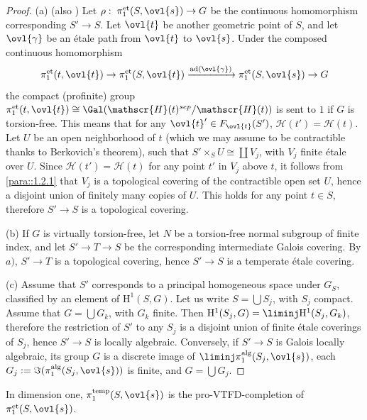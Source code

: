 \begin{proof}
 (a) (\cf also \cite{efgonas}) Let
 $\rho:\;\pi_1^{\mathrm{et}}(S,\ovl{s}) \to G$ be the 
 continuous homomorphism corresponding $S'\to S$. Let $\ovl{t}$ 
 be another geometric point of $S$, and let $\ovl{\gamma}$ be an \'etale
 path from $\ovl{t}$ to $\ovl{s}$.  Under the composed continuous homomorphism
 \begin{equation*}
  \pi_1^{\mathrm{et}}(t,\ovl{t})\to \pi_1^{\mathrm{et}}(S,\ovl{t})
   \xrightarrow{\mathrm{ad}(\ovl{\gamma})}\pi_1^{\mathrm{et}}(S,\ovl{s})\to G  
 \end{equation*}
 the compact (profinite) group $\pi_1^{\mathrm{et}}(t,\ovl{t})\cong
 \Gal(\mathscr{H}(t)^{sep}/\mathscr{H}(t))$ is sent to 
 $1$ if $G$ is torsion-free. This means that for any $\ovl{t}'\in
 F_{\ovl{t}}(S')$,  
 $\mathscr{H}(t')=\mathscr{H}(t)$. Let $U$ be an open neighborhood of $t$
 (which we may assume to be contractible thanks to Berkovich's theorem),
 such that $S'\times_S U\cong \coprod V_j$, with $V_j$ finite \'etale
 over $U$. Since $\mathscr{H}(t')=\mathscr{H}(t)$ for any point $t'$ in
 $V_j$ above $t$, it follows from \ref{para::1.2.1} that
 $V_j$ is a topological covering of
 the contractible open set $U$, hence a disjoint union of finitely many
 copies of $U$. This holds 
 for any point $t\in S$, therefore $S'\to S$ is a topological covering. 

 (b) If $G$ is virtually torsion-free, let $N$ be a torsion-free normal
 subgroup of finite index, and let $S'\to T\to S$ 
 be the corresponding intermediate Galois covering. By $a)$, $S'\to T$ is
 a topological covering, hence $S'\to S$ is a temperate \'etale covering.

 (c) Assume that $S'$ corresponds to a principal homogeneous space under
 $G_S$, classified by an element of $\mathrm{H}^1(S,G)$. Let us write
 $S=\bigcup S_j$, with $S_j$ compact. Assume that $G=\bigcup G_k$, with
 $G_k$ finite. Then $\mathrm{H}^1(S_j,G)= \liminj \mathrm{H}^1(S_j, G_k)$, therefore the
 restriction of $S'$ to any $S_j$ is a disjoint union of finite \'etale
 coverings of $S_j$, hence 
 $S'\to S$ is locally algebraic. Conversely, if $S'\to S$ is Galois
 locally algebraic, its group $G$ is a discrete image of $\liminj
 \pi_1^{\mathrm{alg}}(S_j,\ovl{s})$, each
 $G_j:=\Im(\pi_1^{\mathrm{alg}}(S_j,\ovl{s}))$ is finite, and $G=\bigcup
 G_j$.
\end{proof}  

\begin{cor}\label{cor::2.1.9} In dimension one, $
 \pi_1^{\mathrm{temp}}(S,\ovl{s})$ is the pro-VTFD-completion of
 $\pi_1^{\mathrm{et}}(S,\ovl{s})$. 
\end{cor}

